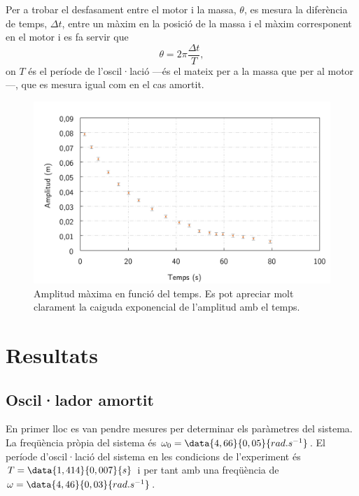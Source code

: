\documentclass[12pt,a4paper]{article}
\numberwithin{equation}{section}
\begin{document}
Per a trobar el desfasament entre el motor i la massa, \( \theta \), es mesura la diferència de temps, \( \Delta t \), entre un màxim en la posició de la massa i el màxim corresponent en el motor i es fa servir que
\begin{equation}
  \theta = 2\pi \dfrac{\Delta t}{T}, 
\end{equation}
on \( T \) és el període de l'oscil·lació ---és el mateix per a la massa que per al motor---, que es mesura igual com en el cas amortit.  

\begin{figure}[htb]
	\centering
	\includegraphics[scale=0.6]{amplitud.png}
	\caption{Amplitud màxima en funció del temps. Es pot apreciar molt clarament la caiguda exponencial de l'amplitud amb el temps.}
	\label{fig:amplitud en funcio del temps}
\end{figure}

\section{Resultats} \label{sec:resultats}
\subsection{Oscil·lador amortit}
En primer lloc es van pendre mesures per determinar els paràmetres del sistema. La freqüència pròpia del sistema és \( \omega_0 = \data{4,66}{0,05}{rad.s^{-1}} \). El període d'oscil·lació del sistema en les condicions de l'experiment és \( T = \data{1,414}{0,007}{s} \) i per tant amb una freqüència de \( \omega = \data{4,46}{0,03}{rad.s^{-1}} \). 
\end{document}
